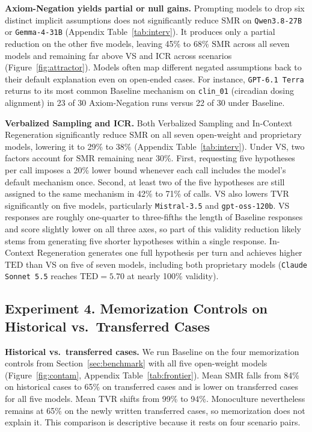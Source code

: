 \documentclass{article}
\begin{document}
\textbf{Axiom-Negation yields partial or null gains.} Prompting models to drop six distinct implicit assumptions does not significantly reduce $\mathrm{SMR}$ on \texttt{Qwen3.8-27B} or \texttt{Gemma-4-31B} (Appendix Table~\ref{tab:interv}). It produces only a partial reduction on the other five models, leaving 45\% to 68\% $\mathrm{SMR}$ across all seven models and remaining far above VS and ICR across scenarios (Figure~\ref{fig:attractor}). Models often map different negated assumptions back to their default explanation even on open-ended cases. For instance, \texttt{GPT-6.1 Terra} returns to its most common Baseline mechanism on \texttt{clin\_01} (circadian dosing alignment) in 23 of 30 Axiom-Negation runs versus 22 of 30 under Baseline.

\textbf{Verbalized Sampling and ICR.} Both Verbalized Sampling and In-Context Regeneration significantly reduce $\mathrm{SMR}$ on all seven open-weight and proprietary models, lowering it to 29\% to 38\% (Appendix Table~\ref{tab:interv}). Under VS, two factors account for $\mathrm{SMR}$ remaining near 30\%. First, requesting five hypotheses per call imposes a 20\% lower bound whenever each call includes the model's default mechanism once. Second, at least two of the five hypotheses are still assigned to the same mechanism in 42\% to 71\% of calls. VS also lowers $\mathrm{TVR}$ significantly on five models, particularly \texttt{Mistral-3.5} and \texttt{gpt-oss-120b}. VS responses are roughly one-quarter to three-fifths the length of Baseline responses and score slightly lower on all three axes, so part of this validity reduction likely stems from generating five shorter hypotheses within a single response. In-Context Regeneration generates one full hypothesis per turn and achieves higher $\mathrm{TED}$ than VS on five of seven models, including both proprietary models (\texttt{Claude Sonnet 5.5} reaches $\mathrm{TED}=5.70$ at nearly 100\% validity).

\subsection{Experiment 4. Memorization Controls on Historical vs.\ Transferred Cases}

\textbf{Historical vs.\ transferred cases.} We run Baseline on the four memorization controls from Section~\ref{sec:benchmark} with all five open-weight models (Figure~\ref{fig:contam}, Appendix Table~\ref{tab:frontier}). Mean $\mathrm{SMR}$ falls from 84\% on historical cases to 65\% on transferred cases and is lower on transferred cases for all five models. Mean $\mathrm{TVR}$ shifts from 99\% to 94\%. Monoculture nevertheless remains at 65\% on the newly written transferred cases, so memorization does not explain it. This comparison is descriptive because it rests on four scenario pairs.
\end{document}

